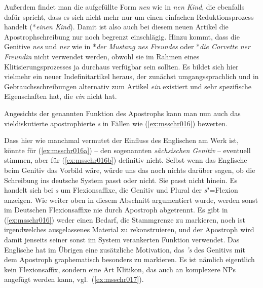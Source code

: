 \begin{exe}
  \ex\label{ex:msschr013} 
  \begin{xlist}
  \end{xlist}
\end{exe}

Außerdem findet man die aufgefüllte Form \textit{nen} wie in \textit{nen Kind}, die ebenfalls dafür spricht, dass es sich nicht mehr nur um einen einfachen Reduktionsprozess handelt (*\textit{einen Kind}).
Damit ist also auch bei diesem neuen Artikel die Apostrophschreibung nur noch begrenzt einschlägig.
Hinzu kommt, dass die Genitive \textit{nes} und \textit{ner} wie in *\textit{der Mustang nes Freundes} oder *\textit{die Corvette ner Freundin} nicht verwendet werden, obwohl sie im Rahmen eines Klitisierungsprozesses ja durchaus verfügbar sein sollten.
Es bildet sich hier vielmehr ein neuer Indefinitartikel heraus, der zunächst umgangssprachlich und in Gebrauchsschreibungen alternativ zum Artikel \textit{ein} existiert und sehr spezifische Eigenschaften hat, die \textit{ein} nicht hat.

Angesichts der genannten Funktion des Apostrophs kann man nun auch das vieldiskutierte apostrophierte \textit{s} in Fällen wie (\ref{ex:msschr016}) bewerten.

\begin{exe}
  \ex\label{ex:msschr016} 
  \begin{xlist}
  \end{xlist}
\end{exe}

Dass hier wie manchmal vermutet der Einfluss des Englischen am Werk ist, könnte für (\ref{ex:msschr016a}) -- den sogenannten \textit{sächsischen Genitiv} -- eventuell stimmen, aber für (\ref{ex:msschr016b}) definitiv nicht.
Selbst wenn das Englische beim Genitiv das Vorbild wäre, würde uns das noch nichts darüber sagen, ob die Schreibung ins deutsche System passt oder nicht.
Sie passt nicht hinein.
Es handelt sich bei \textit{s} um Flexionsaffixe, die Genitiv und Plural der \textit{s}"=Flexion anzeigen.
Wie weiter oben in diesem Abschnitt argumentiert wurde, werden sonst im Deutschen Flexionsaffixe nie durch Apostroph abgetrennt.
Es gibt in (\ref{ex:msschr016}) weder einen Bedarf, die Stammgrenze zu markieren, noch ist irgendwelches ausgelassenes Material zu rekonstruieren, und der Apostroph wird damit jenseits seiner sonst im System verankerten Funktion verwendet.
Das Englische hat im Übrigen eine zusätzliche Motivation, das \textit{'s} des Genitivs mit dem Apostroph graphematisch besonders zu markieren.
Es ist nämlich eigentlich kein Flexionsaffix, sondern eine Art Klitikon, das auch an komplexere NPs angefügt werden kann, vgl.\ (\ref{ex:msschr017}).

